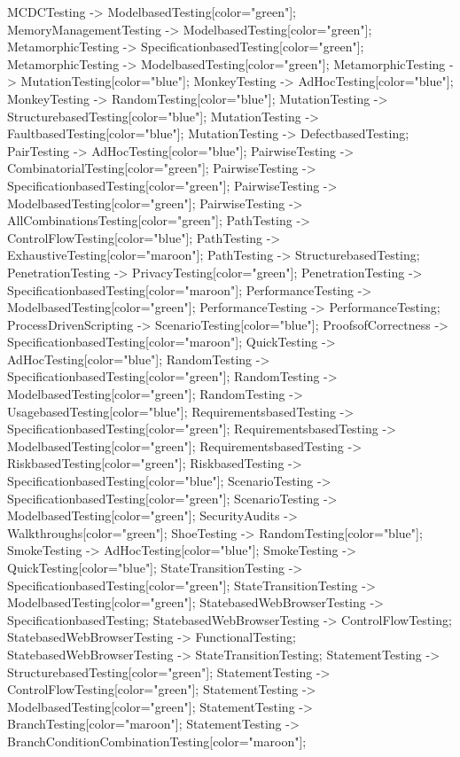 \documentclass{article}
\begin{document}
{MCDCTesting -> ModelbasedTesting[color="green"];
MemoryManagementTesting -> ModelbasedTesting[color="green"];
MetamorphicTesting -> SpecificationbasedTesting[color="green"];
MetamorphicTesting -> ModelbasedTesting[color="green"];
MetamorphicTesting -> MutationTesting[color="blue"];
MonkeyTesting -> AdHocTesting[color="blue"];
MonkeyTesting -> RandomTesting[color="blue"];
MutationTesting -> StructurebasedTesting[color="blue"];
MutationTesting -> FaultbasedTesting[color="blue"];
MutationTesting -> DefectbasedTesting;
PairTesting -> AdHocTesting[color="blue"];
PairwiseTesting -> CombinatorialTesting[color="green"];
PairwiseTesting -> SpecificationbasedTesting[color="green"];
PairwiseTesting -> ModelbasedTesting[color="green"];
PairwiseTesting -> AllCombinationsTesting[color="green"];
PathTesting -> ControlFlowTesting[color="blue"];
PathTesting -> ExhaustiveTesting[color="maroon"];
PathTesting -> StructurebasedTesting;
PenetrationTesting -> PrivacyTesting[color="green"];
PenetrationTesting -> SpecificationbasedTesting[color="maroon"];
PerformanceTesting -> ModelbasedTesting[color="green"];
PerformanceTesting -> PerformanceTesting;
ProcessDrivenScripting -> ScenarioTesting[color="blue"];
ProofsofCorrectness -> SpecificationbasedTesting[color="maroon"];
QuickTesting -> AdHocTesting[color="blue"];
RandomTesting -> SpecificationbasedTesting[color="green"];
RandomTesting -> ModelbasedTesting[color="green"];
RandomTesting -> UsagebasedTesting[color="blue"];
RequirementsbasedTesting -> SpecificationbasedTesting[color="green"];
RequirementsbasedTesting -> ModelbasedTesting[color="green"];
RequirementsbasedTesting -> RiskbasedTesting[color="green"];
RiskbasedTesting -> SpecificationbasedTesting[color="blue"];
ScenarioTesting -> SpecificationbasedTesting[color="green"];
ScenarioTesting -> ModelbasedTesting[color="green"];
SecurityAudits -> Walkthroughs[color="green"];
ShoeTesting -> RandomTesting[color="blue"];
SmokeTesting -> AdHocTesting[color="blue"];
SmokeTesting -> QuickTesting[color="blue"];
StateTransitionTesting -> SpecificationbasedTesting[color="green"];
StateTransitionTesting -> ModelbasedTesting[color="green"];
StatebasedWebBrowserTesting -> SpecificationbasedTesting;
StatebasedWebBrowserTesting -> ControlFlowTesting;
StatebasedWebBrowserTesting -> FunctionalTesting;
StatebasedWebBrowserTesting -> StateTransitionTesting;
StatementTesting -> StructurebasedTesting[color="green"];
StatementTesting -> ControlFlowTesting[color="green"];
StatementTesting -> ModelbasedTesting[color="green"];
StatementTesting -> BranchTesting[color="maroon"];
StatementTesting -> BranchConditionCombinationTesting[color="maroon"];
}
\end{document}
